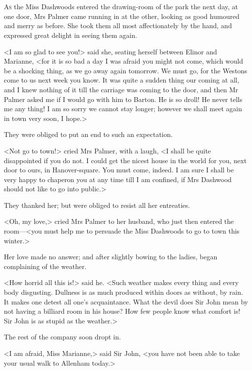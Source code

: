 \chapter[Chapter \thechapter]{}
\lettrine[lraise=0.3]{A}{s} the Miss Dashwoods entered the drawing-room of the park the next day, at one door, Mrs Palmer came running in at the other, looking as good humoured and merry as before. She took them all most affectionately by the hand, and expressed great delight in seeing them again.

<I am so glad to see you!> said she, seating herself between Elinor and Marianne, <for it is so bad a day I was afraid you might not come, which would be a shocking thing, as we go away again tomorrow. We must go, for the Westons come to us next week you know. It was quite a sudden thing our coming at all, and I knew nothing of it till the carriage was coming to the door, and then Mr Palmer asked me if I would go with him to Barton. He is so droll! He never tells me any thing! I am so sorry we cannot stay longer; however we shall meet again in town very soon, I hope.>

They were obliged to put an end to such an expectation.

<Not go to town!> cried Mrs Palmer, with a laugh, <I shall be quite disappointed if you do not. I could get the nicest house in the world for you, next door to ours, in Hanover-square. You must come, indeed. I am sure I shall be very happy to chaperon you at any time till I am confined, if Mrs Dashwood should not like to go into public.>

They thanked her; but were obliged to resist all her entreaties.

<Oh, my love,> cried Mrs Palmer to her husband, who just then entered the room—<you must help me to persuade the Miss Dashwoods to go to town this winter.>

Her love made no answer; and after slightly bowing to the ladies, began complaining of the weather.

<How horrid all this is!> said he. <Such weather makes every thing and every body disgusting. Dullness is as much produced within doors as without, by rain. It makes one detest all one's acquaintance. What the devil does Sir John mean by not having a billiard room in his house? How few people know what comfort is! Sir John is as stupid as the weather.>

The rest of the company soon dropt in.

<I am afraid, Miss Marianne,> said Sir John, <you have not been able to take your usual walk to Allenham today.>

